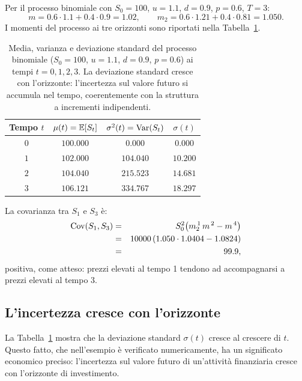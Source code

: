 \begin{example}
\label{es:momenti-binomiale}
Per il processo binomiale con $S_0=100$, $u=1.1$, $d=0.9$, $p=0.6$,
$T=3$:
\[
m=0.6\cdot 1.1+0.4\cdot 0.9=1.02,
\qquad
m_2=0.6\cdot 1.21+0.4\cdot 0.81=1.050.
\]
I momenti del processo ai tre orizzonti sono riportati nella
Tabella~\ref{tab:momenti-binomiale}.

\begin{table}[ht]
\centering
\begin{tabular}{|c|c|c|c|}
\hline
\textbf{Tempo} $t$ & $\mu(t)=\mathbb{E}[S_t]$ &
$\sigma^2(t)=\operatorname{Var}(S_t)$ & $\sigma(t)$\\
\hline
$0$ & $100.000$ & $0.000$ & $0.000$\\
$1$ & $102.000$ & $104.040$ & $10.200$\\
$2$ & $104.040$ & $215.523$ & $14.681$\\
$3$ & $106.121$ & $334.767$ & $18.297$\\
\hline
\end{tabular}
\caption{Media, varianza e deviazione standard del processo binomiale
($S_0=100$, $u=1.1$, $d=0.9$, $p=0.6$) ai tempi $t=0,1,2,3$. La
deviazione standard cresce con l'orizzonte: l'incertezza sul valore
futuro si accumula nel tempo, coerentemente con la struttura a
incrementi indipendenti.}
\label{tab:momenti-binomiale}
\end{table}

La covarianza tra $S_1$ e $S_3$ \`{e}:
\begin{eqnarray*}
\operatorname{Cov}(S_1,S_3)
&=& S_0^2\bigl(m_2^{\,1}\,m^{\,2}-m^{\,4}\bigr)\\
&=& 10000\,(1.050\cdot 1.0404-1.0824)\\
&=& 99.9,
\end{eqnarray*}
positiva, come atteso: prezzi elevati al tempo 1 tendono ad
accompagnarsi a prezzi elevati al tempo 3.
\end{example}



\subsection{L'incertezza cresce con l'orizzonte}

La Tabella~\ref{tab:momenti-binomiale} mostra che la deviazione
standard $\sigma(t)$ cresce al crescere di $t$. Questo fatto, che
nell'esempio \`{e} verificato numericamente, ha un significato
economico preciso: l'incertezza sul valore futuro di un'attivit\`{a}
finanziaria cresce con l'orizzonte di investimento.

